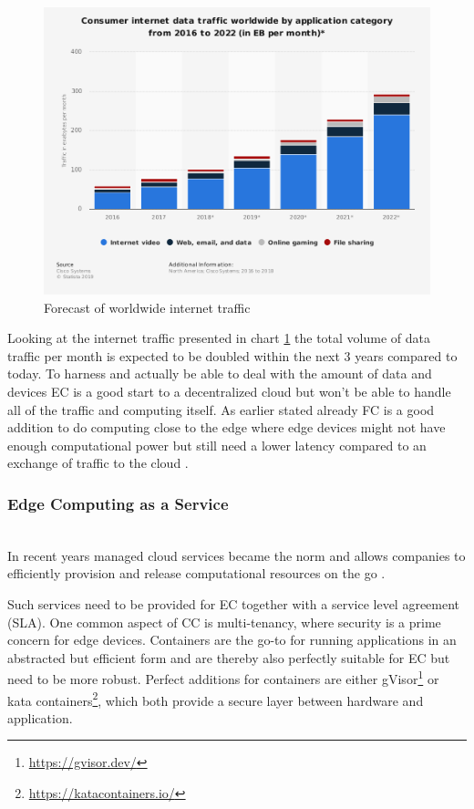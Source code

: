 \begin{figure}[h]
    \centering
    \includegraphics[width=1\textwidth,height=0.8\textwidth]{resources/images/global_traffic.png}
    \caption{Forecast of worldwide internet traffic \cite{statista2}}
    \label{fig:global_traffic}
\end{figure}


Looking at the internet traffic presented in chart \ref{fig:global_traffic} the total volume of data traffic per month is expected to be doubled within the next 3 years compared to today. To harness and actually be able to deal with the amount of data and devices EC is a good start to a decentralized cloud but won’t be able to handle all of the traffic and computing itself. As earlier stated already FC is a good addition to do computing close to the edge where edge devices might not have enough computational power but still need a lower latency compared to an exchange of traffic to the cloud \cite{7796149}.

\subsubsection{Edge Computing as a Service}\hspace*{\fill} \\
In recent years managed cloud services became the norm and allows companies to efficiently provision and release computational resources on the go \cite{7796149}.

Such services need to be provided for EC together with a service level agreement (SLA).
One common aspect of CC is multi-tenancy, where security is a prime concern for edge devices. Containers are the go-to for running applications in an abstracted but efficient form and are thereby also perfectly suitable for EC but need to be more robust. Perfect additions for containers are either gVisor\footnote{\url{https://gvisor.dev/}} or kata containers\footnote{\url{https://katacontainers.io/}}, which both provide a secure layer between hardware and application.

